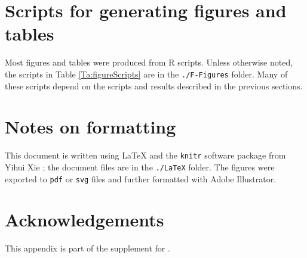 \section{Scripts for generating figures and tables}\label{S:Figures}

Most figures and tables were produced from R scripts.
Unless otherwise noted, the scripts in Table \ref{Ta:figureScripts} are in the
\texttt{./F-Figures} folder. Many of these scripts depend on the scripts
and results described in the previous sections.

\begin{table}[h]
  \begin{center}
    \caption{Scripts for producing tables and figures}\label{Ta:figureScripts}
  \end{center}
\end{table}

\section{Notes on formatting}\label{S:Formatting}

This document is written using \LaTeX{} and the \texttt{knitr} software 
package from Yihui Xie \cite{Xie:2013wu}; the document files are in the \texttt{./LaTeX} folder.
The figures were exported to \texttt{pdf} or \texttt{svg} files and 
further formatted with Adobe Illustrator.

\section{Acknowledgements}
This appendix is part of the supplement for .




